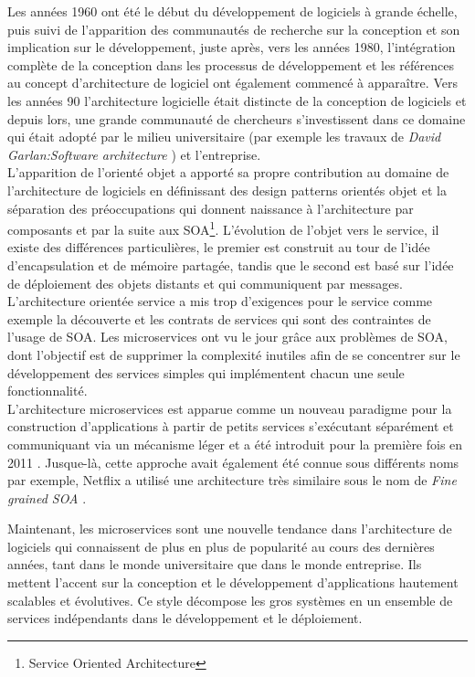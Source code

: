 \documentclass[12pt, a4paper, openany]{report}
\begin{document}
 Les années 1960 ont été le début du développement de logiciels à grande échelle, puis suivi de l'apparition des communautés de recherche sur la conception et son implication sur le développement, juste après, vers les années 1980, l'intégration complète de la conception dans les processus de développement et les références au concept d'architecture de logiciel ont également commencé à apparaître. Vers les années 90 l'architecture logicielle était distincte de la conception de logiciels et depuis lors, une grande communauté de chercheurs s'investissent dans ce domaine qui était adopté par le milieu universitaire (par exemple les travaux de \textit{David Garlan:Software architecture} \cite{refbib4}) et l'entreprise. \\
 
 L'apparition de l'orienté objet a apporté sa propre contribution au domaine de l'architecture de logiciels en définissant des design patterns orientés objet et la séparation des préoccupations qui donnent naissance à l'architecture par composants et par la suite aux SOA\footnote{Service Oriented Architecture}. L'évolution de l'objet vers le service, il existe des différences particulières, le premier est construit au tour de l'idée d'encapsulation et de mémoire partagée, tandis que le second est basé sur l'idée de déploiement des objets distants et qui communiquent par messages.\\
 
 L'architecture orientée service a mis trop d'exigences pour le service comme exemple la découverte et les contrats de services qui sont des contraintes de l'usage de SOA. Les microservices ont vu le jour grâce aux problèmes de SOA, dont l'objectif est de supprimer la complexité inutiles afin de se concentrer sur le développement des services simples qui implémentent chacun une seule fonctionnalité.\\
 
 L'architecture microservices est apparue comme un nouveau paradigme pour la construction d'applications à partir de petits services s'exécutant séparément et communiquant via un mécanisme léger et a été introduit pour la première fois en 2011 \cite{refbibFowler}.  Jusque-là, cette approche avait également été connue sous différents noms par exemple, Netflix a utilisé une architecture très similaire sous le nom de \textit{Fine grained SOA}  \cite{refbibNetflix}.
 
 Maintenant, les microservices sont une nouvelle tendance dans l'architecture de logiciels qui connaissent de plus en plus de popularité au cours des dernières années, tant dans le monde universitaire que dans le monde entreprise. Ils mettent l'accent sur la conception et le développement d'applications hautement scalables et évolutives. Ce style décompose les gros systèmes en un ensemble de services indépendants dans le développement et le déploiement.
 
\end{document}
